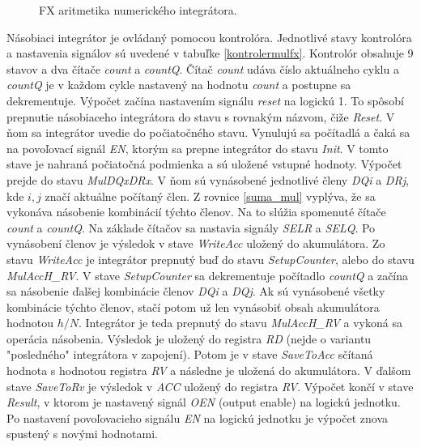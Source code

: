 \bigskip
\begin{figure}[h]
\centering
{}
\caption{FX aritmetika numerického integrátora.}
\label{fxmularitmetic}
\end{figure}
\bigskip

Násobiaci integrátor je ovládaný pomocou kontrolóra. Jednotlivé stavy kontrolóra a nastavenia signálov sú uvedené v tabuľke \ref{kontrolermulfx}. Kontrolór obsahuje 9 stavov a dva čítače \textit{count} a \textit{countQ}. Čítač \textit{count} udáva číslo aktuálneho cyklu a \textit{countQ} je v každom cykle nastavený na hodnotu \textit{count} a postupne sa dekrementuje. Výpočet začína nastavením signálu \textit{reset} na logickú 1. To spôsobí prepnutie násobiaceho integrátora do stavu s rovnakým názvom, čiže \textit{Reset}. V ňom sa integrátor uvedie do počiatočného stavu. Vynulujú sa počítadlá a čaká sa na povoľovací signál \textit{EN}, ktorým sa prepne integrátor do stavu \textit{Init}. V tomto stave je nahraná počiatočná podmienka a sú uložené vstupné hodnoty. Výpočet prejde do stavu \textit{MulDQxDRx}. V ňom sú vynásobené jednotlivé členy \textit{DQi} a \textit{DRj}, kde $ i, j $ značí aktuálne počítaný člen. Z rovnice \ref{suma_mul} vyplýva, že sa vykonáva násobenie kombinácií týchto členov. Na to slúžia spomenuté čítače \textit{count} a \textit{countQ}. Na základe čítačov sa nastavia signály \textit{SELR} a \textit{SELQ}. Po vynásobení členov je výsledok v stave \textit{WriteAcc} uložený do akumulátora. Zo stavu \textit{WriteAcc} je integrátor prepnutý buď do stavu \textit{SetupCounter}, alebo do stavu \textit{MulAccH\_RV}. V stave \textit{SetupCounter} sa dekrementuje počítadlo \textit{countQ} a začína sa násobenie ďalšej kombinácie členov \textit{DQi} a \textit{DQj}. Ak sú vynásobené všetky kombinácie týchto členov, stačí potom už len vynásobiť obsah akumulátora hodnotou $ h/N $. Integrátor je teda prepnutý do stavu \textit{MulAccH\_RV} a vykoná sa operácia násobenia. Výsledok je uložený do registra \textit{RD} (nejde o variantu "posledného" integrátora v zapojení). Potom je v stave \textit{SaveToAcc} sčítaná hodnota s hodnotou registra \textit{RV} a následne je uložená do akumulátora. V ďalšom stave \textit{SaveToRv} je výsledok v \textit{ACC} uložený do registra \textit{RV}. Výpočet končí v stave \textit{Result}, v ktorom je nastavený signál \textit{OEN} (output enable) na logickú jednotku. Po nastavení povoľovacieho signálu \textit{EN} na logickú jednotku je výpočet znova spustený s novými hodnotami.

